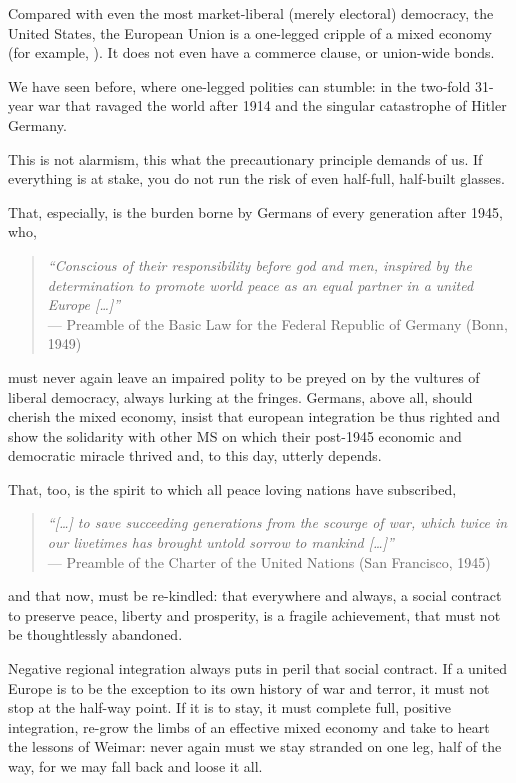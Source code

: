 Compared with even the most market-liberal (merely electoral) democracy, the United States, the European Union is a one-legged cripple of a mixed economy (for example, \citealt{Bordo2011}).
It does not even have a commerce clause, or union-wide bonds.

We have seen before, where one-legged polities can stumble:
in the two-fold 31-year war that ravaged the world after 1914 and the singular catastrophe of Hitler Germany.

This is not alarmism, this what the precautionary principle demands of us.
If everything is at stake, you do not run the risk of even half-full, half-built glasses.

That, especially, is the burden borne by Germans of every generation after 1945, who,
\begin{quote}
	\emph{``Conscious of their responsibility before god and men, inspired by the determination to promote world peace as an equal partner in a united Europe [\ldots]''} \\
	--- Preamble of the Basic Law for the Federal Republic of Germany (Bonn, 1949)
\end{quote}
must never again leave an impaired polity to be preyed on by the vultures of liberal democracy, always lurking at the fringes.
Germans, above all, should cherish the mixed economy, insist that european integration be thus righted and show the solidarity with other \gls{MS} on which their post-1945 economic and democratic miracle thrived and, to this day, utterly depends.

That, too, is the spirit to which all peace loving nations have subscribed,
\begin{quote}
	\emph{``[\ldots] to save succeeding generations from the scourge of war, which twice in our livetimes has brought untold sorrow to mankind [\ldots]''}\\
	--- Preamble of the Charter of the United Nations (San Francisco, 1945)
\end{quote}
and that now, must be re-kindled:
that everywhere and always, a social contract to preserve peace, liberty and prosperity, is a fragile achievement, that must not be thoughtlessly abandoned.

Negative regional integration always puts in peril that social contract.
If a united Europe is to be the exception to its own history of war and terror, it must not stop at the half-way point.
If it is to stay, it must complete full, positive integration, re-grow the limbs of an effective mixed economy and take to heart the lessons of Weimar:
never again must we stay stranded on one leg, half of the way, for we may fall back and loose it all.

